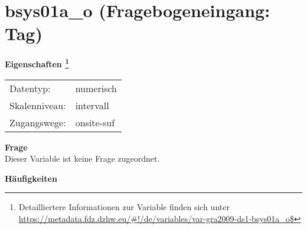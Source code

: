 
    \setcounter{footnote}{0}

    \vspace*{-1.8cm}
	\section{bsys01a\_o (Fragebogeneingang: Tag)}
	\label{section:bsys01a_o}



    \vspace*{0.5cm}
    \noindent\textbf{Eigenschaften
	\footnote{Detailliertere Informationen zur Variable finden sich unter
		\url{https://metadata.fdz.dzhw.eu/\#!/de/variables/var-gra2009-ds1-bsys01a_o$}}}\\
	\begin{tabularx}{\hsize}{@{}lX}
	Datentyp: & numerisch \\
	Skalenniveau: & intervall \\
	Zugangswege: &
	  onsite-suf
 \\
    \end{tabularx}



		\vspace*{0.5cm}
		\noindent\textbf{Frage}\\
		Dieser Variable ist keine Frage zugeordnet.





        		\vspace*{0.5cm}
                \noindent\textbf{Häufigkeiten}

